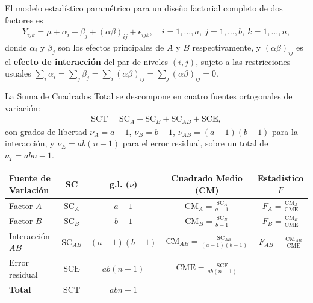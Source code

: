 El modelo estadístico paramétrico para un diseño factorial completo de dos factores es
\begin{align}
	Y_{ijk} = \mu + \alpha_i + \beta_j + (\alpha\beta)_{ij} + \epsilon_{ijk}, \quad i=1,\ldots,a,\ j=1,\ldots,b,\ k=1,\ldots,n,
	\label{eq:modelo_factorial}
\end{align}
donde $\alpha_i$ y $\beta_j$ son los efectos principales de $A$ y $B$ respectivamente, y $(\alpha\beta)_{ij}$ es el \textbf{efecto de interacción} del par de niveles $(i,j)$, sujeto a las restricciones usuales $\sum_i \alpha_i = \sum_j \beta_j = \sum_i (\alpha\beta)_{ij} = \sum_j (\alpha\beta)_{ij} = 0$.

\begin{teorema}
	La Suma de Cuadrados Total se descompone en cuatro fuentes ortogonales de variación:
	\begin{align}
		\text{SCT} = \text{SC}_A + \text{SC}_B + \text{SC}_{AB} + \text{SCE},
	\end{align}
	con grados de libertad $\nu_A = a-1$, $\nu_B = b-1$, $\nu_{AB} = (a-1)(b-1)$ para la interacción, y $\nu_E = ab(n-1)$ para el error residual, sobre un total de $\nu_T = abn - 1$.
\end{teorema}

\begin{center}
	\begin{tabular}{lcccc}
		\hline
		\textbf{Fuente de Variación} & \textbf{SC} & \textbf{g.l. ($\nu$)} & \textbf{Cuadrado Medio (CM)} & \textbf{Estadístico $F$} \\ \hline
		Factor $A$ & $\text{SC}_A$ & $a-1$ & $\text{CM}_A = \frac{\text{SC}_A}{a-1}$ & $F_A = \frac{\text{CM}_A}{\text{CME}}$ \\ [1ex]
		Factor $B$ & $\text{SC}_B$ & $b-1$ & $\text{CM}_B = \frac{\text{SC}_B}{b-1}$ & $F_B = \frac{\text{CM}_B}{\text{CME}}$ \\ [1ex]
		Interacción $AB$ & $\text{SC}_{AB}$ & $(a-1)(b-1)$ & $\text{CM}_{AB} = \frac{\text{SC}_{AB}}{(a-1)(b-1)}$ & $F_{AB} = \frac{\text{CM}_{AB}}{\text{CME}}$ \\ [1ex]
		Error residual & $\text{SCE}$ & $ab(n-1)$ & $\text{CME} = \frac{\text{SCE}}{ab(n-1)}$ & \\ [1ex] \hline
		\textbf{Total} & $\text{SCT}$ & $abn-1$ & & \\ \hline
	\end{tabular}
\end{center}

